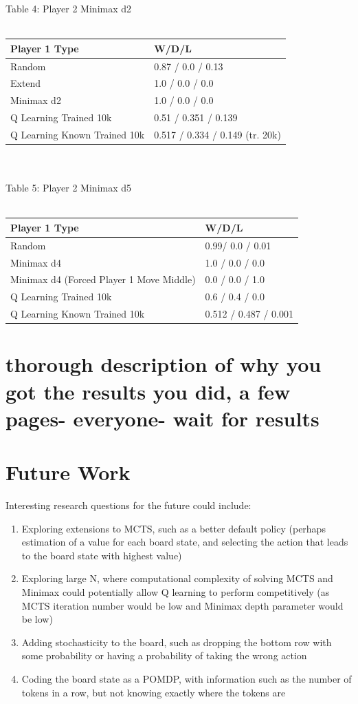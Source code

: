 \documentclass[12pt]{article}
\begin{document}
Table 4: Player 2 Minimax d2\\\\
\begin{tabular}{l|l}
Player 1 Type                & W/D/L                           \\\hline
Random                       &  0.87  / 0.0 / 0.13             \\
Extend                       & 1.0  / 0.0 / 0.0                \\
Minimax d2                   & 1.0   / 0.0 /  0.0              \\
Q Learning Trained 10k         &  0.51  / 0.351 / 0.139        \\
Q Learning Known Trained 10k & 0.517 / 0.334 / 0.149 (tr. 20k)
\end{tabular}\\\\
Table 5: Player 2 Minimax d5\\\\
\begin{tabular}{l|l}
Player 1 Type                     & W/D/L               \\\hline
Random                            &  0.99/ 0.0 / 0.01     \\
Minimax d4                        & 1.0 / 0.0 / 0.0       \\
Minimax d4 (Forced Player 1 Move Middle)   & 0.0  / 0.0 / 1.0    \\
Q Learning Trained 10k            & 0.6 / 0.4 / 0.0       \\
Q Learning Known Trained 10k      & 0.512 / 0.487 / 0.001
\end{tabular}

\section{thorough description of why you got the results you did, a few pages- everyone- wait for results}


\section{Future Work}

Interesting research questions for the future could include:

\begin{enumerate}
\item Exploring extensions to MCTS, such as a better default policy (perhaps estimation of a value for each board state, and selecting the action that leads to the board state with highest value)
\item Exploring large N, where computational complexity of solving MCTS and Minimax could potentially allow Q learning to perform competitively (as MCTS iteration number would be low and Minimax depth parameter would be low)
\item Adding stochasticity to the board, such as dropping the bottom row with some probability or having a probability of taking the wrong action
\item Coding the board state as a POMDP, with information such as the number of tokens in a row, but not knowing exactly where the tokens are 
\end{enumerate}
\end{document}
